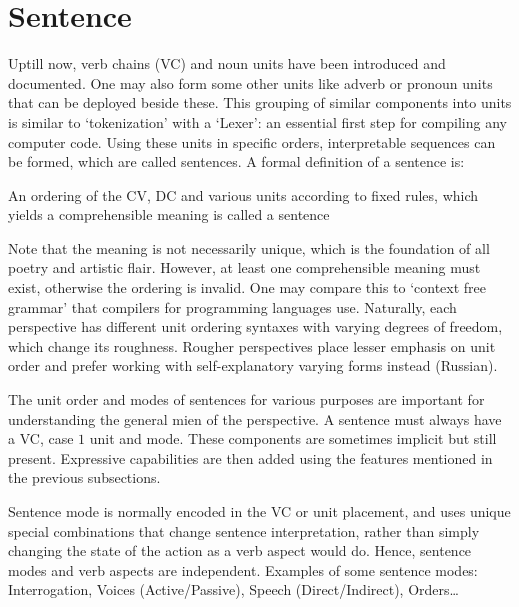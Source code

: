 \section{Sentence} \label{sec:enstce}
Uptill now, verb chains (VC) and noun units have been introduced and documented. One may also form some other units like adverb or pronoun units that can be deployed beside these. This grouping of similar components into units is similar to `tokenization' with a `Lexer': an essential first step for compiling any computer code. Using these units in specific orders, interpretable sequences can be formed, which are called sentences. A formal definition of a sentence is:
\begin{syntax}
    An ordering of the CV, DC and various  units according to fixed rules,  which yields a comprehensible meaning is called a sentence
\end{syntax}
Note that the meaning is not necessarily unique, which is the foundation of all poetry and artistic flair. However, at least one comprehensible meaning must exist, otherwise the ordering is invalid. One may compare this to `context free grammar' that compilers for programming languages use. Naturally, each perspective has different unit ordering syntaxes with varying degrees of freedom, which change its roughness. Rougher perspectives place lesser emphasis on unit order and prefer working with self-explanatory varying forms instead (Russian).

The unit order and modes of sentences for various purposes are important for understanding the general mien of the perspective.  A sentence must always have a VC,  case $1$ unit and mode. These components are sometimes implicit but still present. Expressive capabilities are then added using the features mentioned in the previous subsections.

Sentence mode is normally encoded in the VC or unit placement, and uses  unique special combinations that change sentence interpretation, rather than simply changing the state of the action as a verb aspect would do. Hence, sentence modes and verb aspects are independent. Examples of some sentence modes: Interrogation, Voices (Active/Passive), Speech (Direct/Indirect), Orders\ldots

